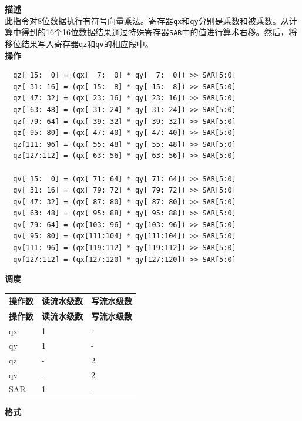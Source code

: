 \textbf{描述}\\
此指令对8位数据执行有符号向量乘法。寄存器\lstinline{qx}和\lstinline{qy}分别是乘数和被乘数。从计算中得到的16个16位数据结果通过特殊寄存器\lstinline{SAR}中的值进行算术右移。然后，将移位结果写入寄存器\lstinline{qz}和\lstinline{qv}的相应段中。\\
\textbf{操作}
\begin{lstlisting}
  qz[ 15:  0] = (qx[  7:  0] * qy[  7:  0]) >> SAR[5:0]
  qz[ 31: 16] = (qx[ 15:  8] * qy[ 15:  8]) >> SAR[5:0]
  qz[ 47: 32] = (qx[ 23: 16] * qy[ 23: 16]) >> SAR[5:0]
  qz[ 63: 48] = (qx[ 31: 24] * qy[ 31: 24]) >> SAR[5:0]
  qz[ 79: 64] = (qx[ 39: 32] * qy[ 39: 32]) >> SAR[5:0]
  qz[ 95: 80] = (qx[ 47: 40] * qy[ 47: 40]) >> SAR[5:0]
  qz[111: 96] = (qx[ 55: 48] * qy[ 55: 48]) >> SAR[5:0]
  qz[127:112] = (qx[ 63: 56] * qy[ 63: 56]) >> SAR[5:0]

  qv[ 15:  0] = (qx[ 71: 64] * qy[ 71: 64]) >> SAR[5:0]
  qv[ 31: 16] = (qx[ 79: 72] * qy[ 79: 72]) >> SAR[5:0]
  qv[ 47: 32] = (qx[ 87: 80] * qy[ 87: 80]) >> SAR[5:0]
  qv[ 63: 48] = (qx[ 95: 88] * qy[ 95: 88]) >> SAR[5:0]
  qv[ 79: 64] = (qx[103: 96] * qy[103: 96]) >> SAR[5:0]
  qv[ 95: 80] = (qx[111:104] * qy[111:104]) >> SAR[5:0]
  qv[111: 96] = (qx[119:112] * qy[119:112]) >> SAR[5:0]
  qv[127:112] = (qx[127:120] * qy[127:120]) >> SAR[5:0]
\end{lstlisting}


\textbf{调度}\\
\begin{longtable}[c]{|l|l|l|}
    \hline
    \rowcolor{lightgray}
    \textbf{操作数} & \textbf{读流水级数} & \textbf{写流水级数} \\\hline
    \endfirsthead
    \hline
    \rowcolor{lightgray}
     \textbf{操作数} & \textbf{读流水级数} & \textbf{写流水级数} \\\hline
    \endhead
    \hline
    \endfoot

    qx & 1 & - \\\hline
  qy & 1 & - \\\hline
     qz & - & 2 \\\hline
     qv & - & 2 \\\hline
    SAR & 1 & -

\end{longtable}

\textbf{格式}\\

